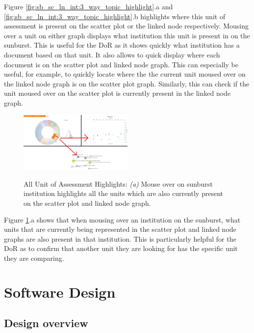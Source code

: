 \documentclass[a4paper, 11pt]{article}
\begin{document}
\noindent Figure \ref{fig:sb_sc_ln_int:3_way_topic_highlight}.a and \ref{fig:sb_sc_ln_int:3_way_topic_highlight}.b highlights where this unit of assessment is present on the scatter plot or the linked node respectively. Mousing over a unit on either graph displays what institution this unit is present in on the sunburst. This is useful for the DoR as it shows quickly what institution has a document based on that unit. It also allows to quick display where each document is on the scatter plot and linked node graph. This can especially be useful, for example, to quickly locate where the the current unit moused over on the linked node graph is on the scatter plot graph. Similarly, this can check if the unit moused over on the scatter plot is currently present in the linked node graph. \\

\begin{figure}[hbt!]
	\centering
      \includegraphics[width=0.5\textwidth]{imgs/sb_sc_ln_int/topics_in_current_and_in_highlighted.png} \\
	\caption{All Unit of Assessment Highlights: 
	\textit{(a)} Mouse over on sunburst institution highlights all the units which are also currently present on the scatter plot and linked node graph.}
    \label{fig:sb_sc_ln_int:topics_in_cur_mouse}
     \noindent\makebox[\linewidth]{\rule{\textwidth}{0.4pt}}
\end{figure}

\noindent Figure \ref{fig:sb_sc_ln_int:topics_in_cur_mouse}.a shows that when mousing over an institution on the sunburst, what units that are currently being represented in the scatter plot and linked node graphs are also present in that institution. This is particularly helpful for the DoR as to confirm that another unit they are looking for has the specific unit they are comparing.



\newpage
\section{Software Design}
\subsection{Design overview}
\end{document}
